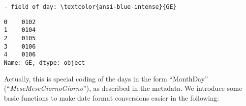 \documentclass[11pt]{article}
\makeatletter
\newcommand{\boxspacing}{\kern\kvtcb@left@rule\kern\kvtcb@boxsep}
\newcommand{\prompt}[4]{
        \ttfamily\llap{{\color{#2}[#3]:\hspace{3pt}#4}}\vspace{-\baselineskip}
    }
\makeatother
\begin{document}
    \begin{Verbatim}[commandchars=\\\{\}]
- field of day: \textcolor{ansi-blue-intense}{GE}
    \end{Verbatim}

            \begin{tcolorbox}[breakable, size=fbox, boxrule=.5pt, pad at break*=1mm, opacityfill=0]
\prompt{Out}{outcolor}{19}{\boxspacing}
\begin{Verbatim}[commandchars=\\\{\}]
0    0102
1    0104
2    0105
3    0106
4    0106
Name: GE, dtype: object
\end{Verbatim}
\end{tcolorbox}
        
    Actually, this is special coding of the days in the form ``MonthDay''
(``\emph{MeseMeseGiornoGiorno}''), as described in the metadata. We
introduce some basic functions to make date format conversions easier in
the following:
\end{document}

